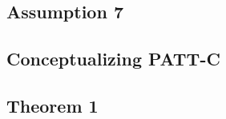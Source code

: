 \documentclass[hidelinks,12pt,letterpaper]{article}
\begin{document}
\subsection{Assumption 7}

\subsection{Conceptualizing PATT-C}


\subsection{Theorem 1}
\end{document}

